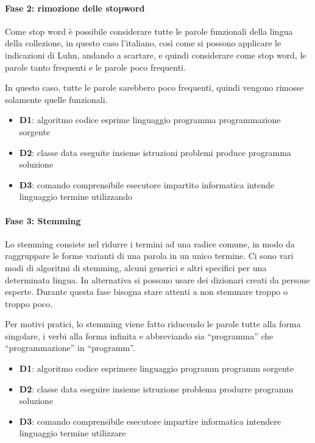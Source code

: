 \paragraph{Fase 2: rimozione delle stopword}

Come stop word è possibile considerare tutte le parole funzionali della lingua della collezione, in questo caso l'italiano, così come si possono applicare le indicazioni di Luhn, andando a scartare, e quindi considerare come stop word, le parole tanto frequenti e le parole poco frequenti.

In questo caso, tutte le parole sarebbero poco frequenti, quindi vengono rimosse solamente quelle funzionali.

\begin{itemize}
	\item \textbf{D1}: algoritmo codice esprime linguaggio programma programmazione sorgente
	\item \textbf{D2}: classe data eseguite insieme istruzioni problemi produce programma soluzione
	\item \textbf{D3}: comando comprensibile esecutore impartito informatica intende linguaggio termine utilizzando
\end{itemize}

\paragraph{Fase 3: Stemming} 

Lo stemming consiste nel ridurre i termini ad una radice comune, in modo da raggruppare le forme varianti di una parola in un unico termine. Ci sono vari modi di algoritmi di stemming, alcuni generici e altri specifici per una determinata lingua. In alternativa si possono usare dei dizionari creati da persone esperte. Durante questa fase bisogna stare attenti a non stemmare troppo o troppo poco.

Per motivi pratici, lo stemming viene fatto riducendo le parole tutte alla forma singolare, i verbi alla forma infinita e abbreviando sia ``programma'' che ``programmazione'' in ``programm''.

\begin{itemize}
	\item \textbf{D1}: algoritmo codice esprimere linguaggio programm programm sorgente
	\item \textbf{D2}: classe data eseguire insieme istruzione problema produrre programm soluzione
	\item \textbf{D3}: comando comprensibile esecutore impartire informatica intendere linguaggio termine utilizzare
\end{itemize}

